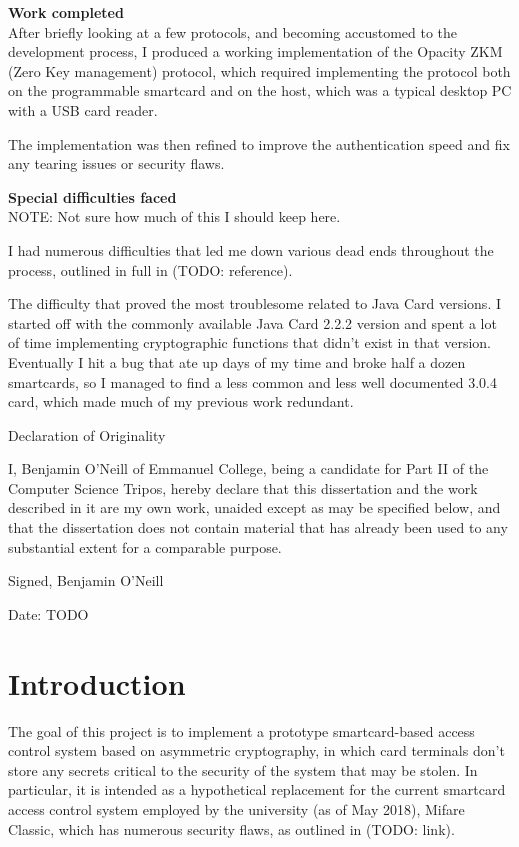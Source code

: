 \documentclass[12pt]{article}
\begin{document}
\vspace{0.3in}
{\large\bf Work completed}\\
After briefly looking at a few protocols, and becoming accustomed to the development process, I produced a working implementation of the Opacity ZKM (Zero Key management) protocol, which required implementing the protocol both on the programmable smartcard and on the host, which was a typical desktop PC with a USB card reader. 

The implementation was then refined to improve the authentication speed and fix any tearing issues or security flaws.

\vspace{0.3in}
{\large\bf Special difficulties faced}\\
NOTE: Not sure how much of this I should keep here.

I had numerous difficulties that led me down various dead ends throughout the process, outlined in full in (TODO: reference).

The difficulty that proved the most troublesome related to Java Card versions. I started off with the commonly available Java Card 2.2.2 version and spent a lot of time implementing cryptographic functions that didn't exist in that version. Eventually I hit a bug that ate up days of my time and broke half a dozen smartcards, so I managed to find a less common and less well documented 3.0.4 card, which made much of my previous work redundant.


\pagebreak

\centerline{\Large Declaration of Originality}
I, Benjamin O'Neill of Emmanuel College, being a candidate for Part II of the Computer Science Tripos, hereby declare that this dissertation and the work described in it are my own work, unaided except as may be specified below, and that the dissertation does not contain material that has already been used to any substantial extent for a comparable purpose.

Signed, Benjamin O'Neill

\vspace{0.2in}
Date: TODO
\pagebreak

\tableofcontents
\pagebreak

\section{Introduction}
The goal of this project is to implement a prototype smartcard-based access control system based on asymmetric cryptography, in which card terminals don't store any secrets critical to the security of the system that may be stolen. In particular, it is intended as a hypothetical replacement for the current smartcard access control system employed by the university (as of May 2018), Mifare Classic, which has numerous security flaws, as outlined in (TODO: link). 
\end{document}

